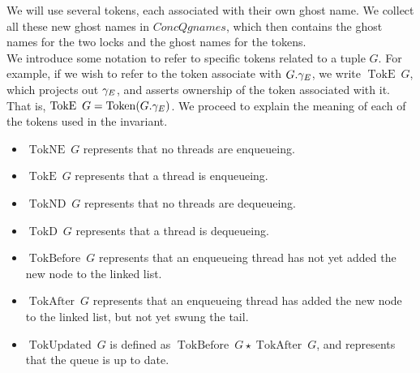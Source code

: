 \documentclass[a4paper, 10pt]{report}
\theoremstyle{definition}
\newcommand{\ConcQgnames}{ConcQgnames}
\newcommand{\Qg}{G}
\newcommand{\Token}[1]{\operatorname{Token}(#1)}
\newcommand{\TokE}[1]{\operatorname{TokE} ~ #1}
\newcommand{\TokEQg}{\TokE{\Qg}}
\newcommand{\TokNE}[1]{\operatorname{TokNE} ~ #1}
\newcommand{\TokNEQg}{\TokNE{\Qg}}
\newcommand{\TokD}[1]{\operatorname{TokD} ~ #1}
\newcommand{\TokDQg}{\TokD{\Qg}}
\newcommand{\TokND}[1]{\operatorname{TokND} ~ #1}
\newcommand{\TokNDQg}{\TokND{\Qg}}
\newcommand{\TokBefore}[1]{\operatorname{TokBefore} ~ #1}
\newcommand{\TokBeforeQg}{\TokBefore{\Qg}}
\newcommand{\TokAfter}[1]{\operatorname{TokAfter} ~ #1}
\newcommand{\TokAfterQg}{\TokAfter{\Qg}}
\newcommand{\TokUpdated}[1]{\operatorname{TokUpdated} ~ #1}
\newcommand{\TokUpdatedQg}{\TokUpdated{\Qg}}
\begin{document}
We will use several tokens, each associated with their own ghost name. We collect all these new ghost names in $\ConcQgnames$, which then contains the ghost names for the two locks and the ghost names for the tokens.\\
We introduce some notation to refer to specific tokens related to a tuple $\Qg$. For example, if we wish to refer to the token associate with $\Qg.\gname_E$, we write $\TokEQg$, which projects out $\gamma_E$, and asserts ownership of the token associated with it. That is, $\TokEQg = \Token{\Qg.\gname_E}$. We proceed to explain the meaning of each of the tokens used in the invariant.
\begin{itemize}
  \item $\TokNEQg$ represents that no threads are enqueueing.
  \item $\TokEQg$ represents that a thread is enqueueing.
  \item $\TokNDQg$ represents that no threads are dequeueing.
  \item $\TokDQg$ represents that a thread is dequeueing.
  \item $\TokBeforeQg$ represents that an enqueueing thread has not yet added the new node to the linked list.
  \item $\TokAfterQg$ represents that an enqueueing thread has added the new node to the linked list, but not yet swung the tail.
  \item $\TokUpdatedQg$ is defined as $\TokBeforeQg \star{} \TokAfterQg$, and represents that the queue is up to date.
\end{itemize}
\end{document}
